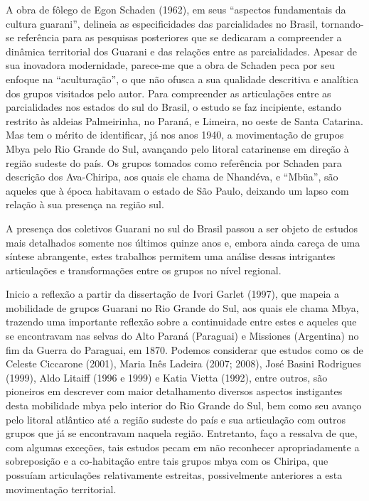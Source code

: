 {{A obra de fôlego de Egon Schaden (1962), em seus ``aspectos fundamentais
da cultura guarani'', delineia as especificidades das parcialidades no
Brasil, tornando-se referência para as pesquisas posteriores que se
dedicaram a compreender a dinâmica territorial dos Guarani e das
relações entre as parcialidades. Apesar de sua inovadora modernidade,
parece-me que a obra de Schaden peca por seu enfoque na ``aculturação'',
o que não ofusca a sua qualidade descritiva e analítica dos grupos
visitados pelo autor. Para compreender as articulações entre as
parcialidades nos estados do sul do Brasil, o estudo se faz incipiente,
estando restrito às aldeias Palmeirinha, no Paraná, e Limeira, no oeste
de Santa Catarina. Mas tem o mérito de identificar, já nos anos 1940, a
movimentação de grupos Mbya pelo Rio Grande do Sul, avançando pelo
litoral catarinense em direção à região sudeste do país. Os grupos
tomados como referência por Schaden para descrição dos Ava-Chiripa, aos
quais ele chama de Nhandéva, e ``Mbüa'', são aqueles que à época
habitavam o estado de São Paulo, deixando um lapso com relação à sua
presença na região sul.

A presença dos coletivos Guarani no sul do Brasil passou a ser objeto de
estudos mais detalhados somente nos últimos quinze anos e, embora ainda
careça de uma síntese abrangente, estes trabalhos permitem uma análise
dessas intrigantes articulações e transformações entre os grupos no
nível regional. 

Inicio a reflexão a partir da dissertação de Ivori Garlet (1997), que
mapeia a mobilidade de grupos Guarani no Rio Grande do Sul, aos quais
ele chama Mbya, trazendo uma importante reflexão sobre a continuidade
entre estes e aqueles que se encontravam nas selvas do Alto Paraná
(Paraguai) e Missiones (Argentina) no fim da Guerra do Paraguai, em
1870. Podemos considerar que estudos como os de Celeste Ciccarone
(2001), Maria Inês Ladeira (2007; 2008), José Basini Rodrigues (1999),
Aldo Litaiff (1996 e 1999) e Katia Vietta (1992), entre outros, são
pioneiros em descrever com maior detalhamento diversos aspectos
instigantes desta mobilidade mbya pelo interior do Rio Grande do Sul,
bem como seu avanço pelo litoral atlântico até a região sudeste do país
e sua articulação com outros grupos que já se encontravam naquela
região. Entretanto, faço a ressalva de que, com algumas exceções, tais
estudos pecam em não reconhecer apropriadamente a sobreposição e a
co-habitação entre tais grupos mbya com os Chiripa, que possuíam
articulações relativamente estreitas, possivelmente anteriores a esta
movimentação territorial.

}}

